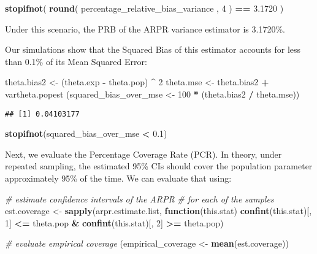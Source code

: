 \documentclass[
]{book}
\newenvironment{Shaded}{\begin{snugshade}}{\end{snugshade}}
\newcommand{\CommentTok}[1]{\textcolor[rgb]{0.56,0.35,0.01}{\textit{#1}}}
\newcommand{\ControlFlowTok}[1]{\textcolor[rgb]{0.13,0.29,0.53}{\textbf{#1}}}
\newcommand{\DecValTok}[1]{\textcolor[rgb]{0.00,0.00,0.81}{#1}}
\newcommand{\FloatTok}[1]{\textcolor[rgb]{0.00,0.00,0.81}{#1}}
\newcommand{\FunctionTok}[1]{\textcolor[rgb]{0.13,0.29,0.53}{\textbf{#1}}}
\newcommand{\NormalTok}[1]{#1}
\newcommand{\OtherTok}[1]{\textcolor[rgb]{0.56,0.35,0.01}{#1}}
\newcommand{\SpecialCharTok}[1]{\textcolor[rgb]{0.81,0.36,0.00}{\textbf{#1}}}
\begin{document}
\begin{Shaded}
\begin{Highlighting}[]
\FunctionTok{stopifnot}\NormalTok{( }\FunctionTok{round}\NormalTok{( percentage\_relative\_bias\_variance , }\DecValTok{4}\NormalTok{ ) }\SpecialCharTok{==} \FloatTok{3.1720}\NormalTok{ ) }
\end{Highlighting}
\end{Shaded}

Under this scenario, the PRB of the ARPR variance estimator is 3.1720\%.

Our simulations show that the Squared Bias of this estimator accounts for less than 0.1\% of its Mean Squared Error:

\begin{Shaded}
\begin{Highlighting}[]
\NormalTok{theta.bias2 }\OtherTok{\textless{}{-}}\NormalTok{ (theta.exp }\SpecialCharTok{{-}}\NormalTok{ theta.pop) }\SpecialCharTok{\^{}} \DecValTok{2}
\NormalTok{theta.mse }\OtherTok{\textless{}{-}}\NormalTok{ theta.bias2 }\SpecialCharTok{+}\NormalTok{ vartheta.popest}
\NormalTok{(squared\_bias\_over\_mse }\OtherTok{\textless{}{-}}  \DecValTok{100} \SpecialCharTok{*}\NormalTok{ (theta.bias2 }\SpecialCharTok{/}\NormalTok{ theta.mse))}
\end{Highlighting}
\end{Shaded}

\begin{verbatim}
## [1] 0.04103177
\end{verbatim}

\begin{Shaded}
\begin{Highlighting}[]
\FunctionTok{stopifnot}\NormalTok{(squared\_bias\_over\_mse }\SpecialCharTok{\textless{}} \FloatTok{0.1}\NormalTok{)}
\end{Highlighting}
\end{Shaded}

Next, we evaluate the Percentage Coverage Rate (PCR). In theory, under repeated sampling, the estimated 95\% CIs should cover the population parameter approximately 95\% of the time. We can evaluate that using:

\begin{Shaded}
\begin{Highlighting}[]
\CommentTok{\# estimate confidence intervals of the ARPR}
\CommentTok{\# for each of the samples}
\NormalTok{est.coverage }\OtherTok{\textless{}{-}}
  \FunctionTok{sapply}\NormalTok{(arpr.estimate.list, }\ControlFlowTok{function}\NormalTok{(this.stat)}
    \FunctionTok{confint}\NormalTok{(this.stat)[, }\DecValTok{1}\NormalTok{] }\SpecialCharTok{\textless{}=}\NormalTok{ theta.pop }\SpecialCharTok{\&}
      \FunctionTok{confint}\NormalTok{(this.stat)[, }\DecValTok{2}\NormalTok{] }\SpecialCharTok{\textgreater{}=}\NormalTok{ theta.pop)}

\CommentTok{\# evaluate empirical coverage}
\NormalTok{(empirical\_coverage }\OtherTok{\textless{}{-}} \FunctionTok{mean}\NormalTok{(est.coverage))}
\end{Highlighting}
\end{Shaded}
\end{document}
